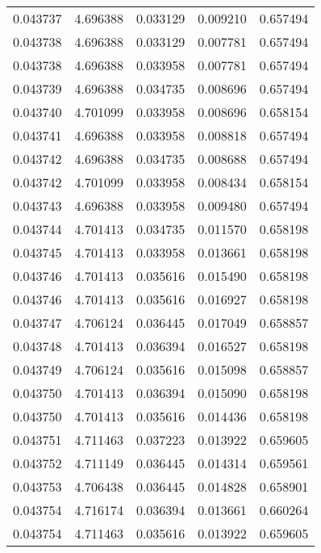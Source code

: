 \begin{tabular}{lrrrr}
0.043737    &  4.696388 &  0.033129 &  0.009210 &             0.657494 \\
0.043738    &  4.696388 &  0.033129 &  0.007781 &             0.657494 \\
0.043738    &  4.696388 &  0.033958 &  0.007781 &             0.657494 \\
0.043739    &  4.696388 &  0.034735 &  0.008696 &             0.657494 \\
0.043740    &  4.701099 &  0.033958 &  0.008696 &             0.658154 \\
0.043741    &  4.696388 &  0.033958 &  0.008818 &             0.657494 \\
0.043742    &  4.696388 &  0.034735 &  0.008688 &             0.657494 \\
0.043742    &  4.701099 &  0.033958 &  0.008434 &             0.658154 \\
0.043743    &  4.696388 &  0.033958 &  0.009480 &             0.657494 \\
0.043744    &  4.701413 &  0.034735 &  0.011570 &             0.658198 \\
0.043745    &  4.701413 &  0.033958 &  0.013661 &             0.658198 \\
0.043746    &  4.701413 &  0.035616 &  0.015490 &             0.658198 \\
0.043746    &  4.701413 &  0.035616 &  0.016927 &             0.658198 \\
0.043747    &  4.706124 &  0.036445 &  0.017049 &             0.658857 \\
0.043748    &  4.701413 &  0.036394 &  0.016527 &             0.658198 \\
0.043749    &  4.706124 &  0.035616 &  0.015098 &             0.658857 \\
0.043750    &  4.701413 &  0.036394 &  0.015090 &             0.658198 \\
0.043750    &  4.701413 &  0.035616 &  0.014436 &             0.658198 \\
0.043751    &  4.711463 &  0.037223 &  0.013922 &             0.659605 \\
0.043752    &  4.711149 &  0.036445 &  0.014314 &             0.659561 \\
0.043753    &  4.706438 &  0.036445 &  0.014828 &             0.658901 \\
0.043754    &  4.716174 &  0.036394 &  0.013661 &             0.660264 \\
0.043754    &  4.711463 &  0.035616 &  0.013922 &             0.659605 \\

\end{tabular}
